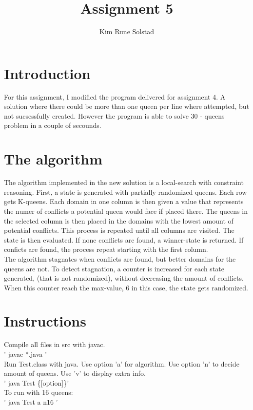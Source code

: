 \documentclass[a4paper]{article}
\author{Kim Rune Solstad}
\title{Assignment 5}
\begin{document}
\maketitle
\section{Introduction}
For this assignment, I modified the program delivered for assignment 4.
A solution where there could be more than one queen per line where attempted, but not sucsessfully created. However the program is able to solve 30 - queens problem in a couple of secounds. 

\section{The algorithm}
The algorithm implemented in the new solution is a local-search with constraint reasoning. First, a state is generated with partially randomized queens. Each row gets K-queens. Each domain in one column is then given a value that represents the numer of conflicts a potential queen would face if placed there. The queens in the selected column is then placed in the domains with the lowest amount of potential conflicts. This process is repeated until all columns are visited. The state is then evaluated. If none conflicts are found, a winner-state is returned. If conficts are found, the process repeat starting with the first column.
\\
The algorithm stagnates when conflicts are found, but better domains for the queens are not. To detect stagnation, a counter is increased for each state generated, (that is not randomized), without decreasing the amount of conflicts. When this counter reach the max-value, 6 in this case, the state gets randomized.

\section{Instructions} 
Compile all files in src with javac. 
\\' javac *.java ' \\
Run Test.class with java. Use option 'a' for algorithm. Use option 'n' to decide amount of queens. Use 'v' to display extra info.
\\ ' java Test \{[option]\}' \\
To run with 16 queens:
\\ ' java Test a n16 ' \\
\end{document}
